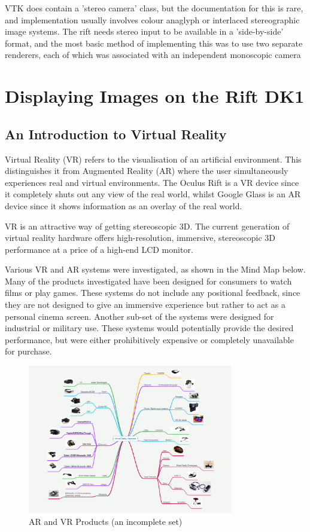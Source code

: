 \documentclass[MSc,paper=a4,pagesize=auto]{icldt}
\begin{document}
VTK does contain a 'stereo camera' class, but the documentation for this is rare, and implementation usually involves colour anaglyph or interlaced stereographic image systems. The rift needs stereo input to be available in a 'side-by-side' format, and the most basic method of implementing this was to use two separate renderers, each of which was associated with an independent monoscopic camera 

\chapter{Displaying Images on the Rift DK1}
\section{An Introduction to Virtual Reality}
Virtual Reality (VR) refers to the visualisation of an artificial environment. This distinguishes it from Augmented Reality (AR) where the user simultaneously experiences real and virtual environments. The Oculus Rift is a VR device since it completely shuts out any view of the real world, whilst Google Glass is an AR device since it shows information as an overlay of the real world.

VR is an attractive way of getting stereoscopic 3D. The current generation of virtual reality hardware offers high-resolution, immersive, stereoscopic 3D performance at a price of a high-end LCD monitor. 

Various VR and AR systems were investigated, as shown in the Mind Map below. Many of the products investigated have been designed for consumers to watch films or play games. These systems do not include any positional feedback, since they are not designed to give an immersive experience but rather to act as a personal cinema screen. Another sub-set of the systems were designed for industrial or military use. These systems would potentially provide the desired performance, but were either prohibitively expensive or completely unavailable for purchase. 

\begin{figure}[htbp!]
    \centering
    \includegraphics[width=0.8\textwidth]{resources/vr_headsets}
    \caption{AR and VR Products (an incomplete set)}
    \label{fig:vr_headsets}
\end{figure}
\end{document}
